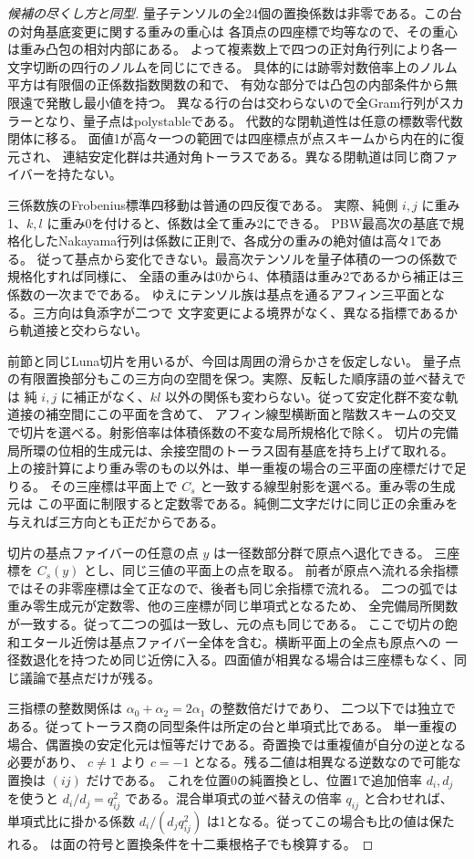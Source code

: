 \begin{proof}[候補の尽くし方と同型]
量子テンソルの全24個の置換係数は非零である。この台の対角基底変更に関する重みの重心は
各頂点の四座標で均等なので、その重心は重み凸包の相対内部にある。
よって複素数上で四つの正対角行列により各一文字切断の四行のノルムを同じにできる。
具体的には跡零対数倍率上のノルム平方は有限個の正係数指数関数の和で、
有効な部分では凸包の内部条件から無限遠で発散し最小値を持つ。
異なる行の台は交わらないので全Gram行列がスカラーとなり、量子点はpolystableである。
代数的な閉軌道性は任意の標数零代数閉体に移る。
面値1が高々一つの範囲では四座標点が点スキームから内在的に復元され、
連結安定化群は共通対角トーラスである。異なる閉軌道は同じ商ファイバーを持たない。

三係数族のFrobenius標準四移動は普通の四反復である。
実際、純側 $i,j$ に重み1、$k,l$ に重み0を付けると、係数は全て重み2にできる。
PBW最高次の基底で規格化したNakayama行列は係数に正則で、各成分の重みの絶対値は高々1である。
従って基点から変化できない。最高次テンソルを量子体積の一つの係数で規格化すれば同様に、
全語の重みは0から4、体積語は重み2であるから補正は三係数の一次までである。
ゆえにテンソル族は基点を通るアフィン三平面となる。三方向は負添字が二つで
文字変更による境界がなく、異なる指標であるから軌道接と交わらない。

前節と同じLuna切片を用いるが、今回は周囲の滑らかさを仮定しない。
量子点の有限置換部分もこの三方向の空間を保つ。実際、反転した順序語の並べ替えでは
純 $i,j$ に補正がなく、$kl$ 以外の関係も変わらない。従って安定化群不変な軌道接の補空間にこの平面を含めて、
アフィン線型横断面と階数スキームの交叉で切片を選べる。射影倍率は体積係数の不変な局所規格化で除く。
切片の完備局所環の位相的生成元は、余接空間のトーラス固有基底を持ち上げて取れる。
上の接計算により重み零のもの以外は、単一重複の場合の三平面の座標だけで足りる。
その三座標は平面上で $C_s$ と一致する線型射影を選べる。重み零の生成元は
この平面に制限すると定数零である。純側二文字だけに同じ正の余重みを与えれば三方向とも正だからである。

切片の基点ファイバーの任意の点 $y$ は一径数部分群で原点へ退化できる。
三座標を $C_s(y)$ とし、同じ三値の平面上の点を取る。
前者が原点へ流れる余指標ではその非零座標は全て正なので、後者も同じ余指標で流れる。
二つの弧では重み零生成元が定数零、他の三座標が同じ単項式となるため、
全完備局所関数が一致する。従って二つの弧は一致し、元の点も同じである。
ここで切片の飽和エタール近傍は基点ファイバー全体を含む。横断平面上の全点も原点への
一径数退化を持つため同じ近傍に入る。四面値が相異なる場合は三座標もなく、同じ議論で基点だけが残る。

三指標の整数関係は $\alpha_0+\alpha_2=2\alpha_1$ の整数倍だけであり、
二つ以下では独立である。従ってトーラス商の同型条件は所定の台と単項式比である。
単一重複の場合、偶置換の安定化元は恒等だけである。奇置換では重複値が自分の逆となる必要があり、
$c\ne1$ より $c=-1$ となる。残る二値は相異なる逆数なので可能な置換は $(ij)$ だけである。
これを位置0の純置換とし、位置1で追加倍率 $d_i,d_j$ を使うと
$d_i/d_j=q_{ij}^2$ である。混合単項式の並べ替えの倍率 $q_{ij}$ と合わせれば、
単項式比に掛かる係数 $d_i/(d_jq_{ij}^2)$ は1となる。従ってこの場合も比の値は保たれる。
 は面の符号と置換条件を十二乗根格子でも検算する。
\end{proof}
